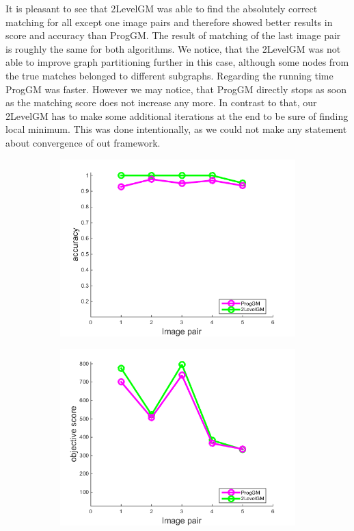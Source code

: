 It is pleasant to see that 2LevelGM was able to find the absolutely correct matching for all except one image pairs and therefore showed better results in score and accuracy than ProgGM. The result of matching of the last image pair is roughly the same for both algorithms. We notice, that the 2LevelGM was not able to improve graph partitioning further in this case, although some nodes from the true matches belonged to different subgraphs. Regarding the running time ProgGM was faster. However we may notice, that ProgGM directly stops as soon as the matching score does not increase any more. In contrast to that, our 2LevelGM has to make some additional iterations at the end to be sure of finding local minimum. This was done intentionally, as we could not make any statement about convergence of out framework.

\begin{figure}[h] \centering
		\begin{subfigure}[b]{0.33\textwidth}
			\centering
			\includegraphics[scale=0.35]{"chapter3/fig/ImageTrafo/anchor_descr/using_cpd_afftrafo/performance/accuracy1"} 
		\end{subfigure} 
		\begin{subfigure}[b]{0.33\textwidth}
			\centering
			\includegraphics[scale=0.35]{"chapter3/fig/ImageTrafo/anchor_descr/using_cpd_afftrafo/performance/score1"} 

\end{subfigure}
\end{figure}
